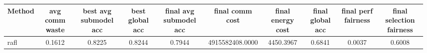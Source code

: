 \begin{tabular}{lccccccccc}
\toprule
Method & avg comm waste & best avg submodel acc & best global acc & final avg submodel acc & final comm cost & final energy cost & final global acc & final perf fairness & final selection fairness \\
\midrule
rafl & 0.1612 & 0.8225 & 0.8244 & 0.7944 & 4915582408.0000 & 4450.3967 & 0.6841 & 0.0037 & 0.6008 \\
\bottomrule
\end{tabular}
